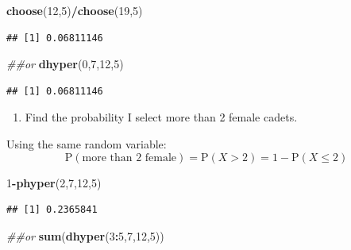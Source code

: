 \documentclass[
]{book}
\newenvironment{Shaded}{\begin{snugshade}}{\end{snugshade}}
\newcommand{\CommentTok}[1]{\textcolor[rgb]{0.56,0.35,0.01}{\textit{#1}}}
\newcommand{\DecValTok}[1]{\textcolor[rgb]{0.00,0.00,0.81}{#1}}
\newcommand{\KeywordTok}[1]{\textcolor[rgb]{0.13,0.29,0.53}{\textbf{#1}}}
\newcommand{\NormalTok}[1]{#1}
\newcommand{\OperatorTok}[1]{\textcolor[rgb]{0.81,0.36,0.00}{\textbf{#1}}}
\providecommand{\tightlist}{%
  \setlength{\itemsep}{0pt}\setlength{\parskip}{0pt}}
\begin{document}
\begin{Shaded}
\begin{Highlighting}[]
\KeywordTok{choose}\NormalTok{(}\DecValTok{12}\NormalTok{,}\DecValTok{5}\NormalTok{)}\OperatorTok{/}\KeywordTok{choose}\NormalTok{(}\DecValTok{19}\NormalTok{,}\DecValTok{5}\NormalTok{)}
\end{Highlighting}
\end{Shaded}

\begin{verbatim}
## [1] 0.06811146
\end{verbatim}

\begin{Shaded}
\begin{Highlighting}[]
\CommentTok{##or}
\KeywordTok{dhyper}\NormalTok{(}\DecValTok{0}\NormalTok{,}\DecValTok{7}\NormalTok{,}\DecValTok{12}\NormalTok{,}\DecValTok{5}\NormalTok{)}
\end{Highlighting}
\end{Shaded}

\begin{verbatim}
## [1] 0.06811146
\end{verbatim}

\begin{enumerate}
\def\labelenumi{\alph{enumi}.}
\setcounter{enumi}{1}
\tightlist
\item
  Find the probability I select more than 2 female cadets.
\end{enumerate}

Using the same random variable:
\[
\mbox{P}(\mbox{more than 2 female})=\mbox{P}(X>2)=1-\mbox{P}(X\leq 2)
\]

\begin{Shaded}
\begin{Highlighting}[]
\DecValTok{1}\OperatorTok{-}\KeywordTok{phyper}\NormalTok{(}\DecValTok{2}\NormalTok{,}\DecValTok{7}\NormalTok{,}\DecValTok{12}\NormalTok{,}\DecValTok{5}\NormalTok{)}
\end{Highlighting}
\end{Shaded}

\begin{verbatim}
## [1] 0.2365841
\end{verbatim}

\begin{Shaded}
\begin{Highlighting}[]
\CommentTok{##or}
\KeywordTok{sum}\NormalTok{(}\KeywordTok{dhyper}\NormalTok{(}\DecValTok{3}\OperatorTok{:}\DecValTok{5}\NormalTok{,}\DecValTok{7}\NormalTok{,}\DecValTok{12}\NormalTok{,}\DecValTok{5}\NormalTok{))}
\end{Highlighting}
\end{Shaded}
\end{document}

